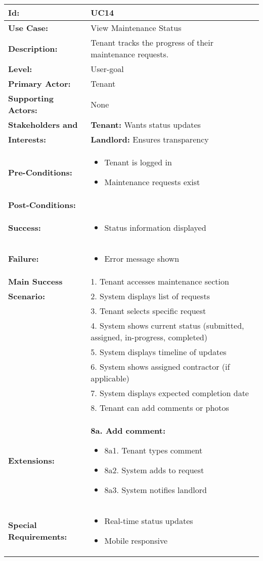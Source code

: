 \documentclass[12pt]{article}
\begin{document}
\begin{tabular}{|p{3cm}|p{11cm}|}
\hline
\textbf{Id:} & UC14 \\
\hline
\textbf{Use Case:} & View Maintenance Status \\
\hline
\textbf{Description:} & Tenant tracks the progress of their maintenance requests. \\
\hline
\textbf{Level:} & User-goal \\
\hline
\textbf{Primary Actor:} & Tenant \\
\hline
\textbf{Supporting Actors:} & None \\
\hline
\textbf{Stakeholders and} & \textbf{Tenant:} Wants status updates \\
\textbf{Interests:} & \textbf{Landlord:} Ensures transparency \\
\hline
\textbf{Pre-Conditions:} & 
\begin{itemize}
    \item Tenant is logged in
    \item Maintenance requests exist
\end{itemize} \\
\hline
\textbf{Post-Conditions:} & \\
\textbf{Success:} & 
\begin{itemize}
    \item Status information displayed
\end{itemize} \\
\textbf{Failure:} & 
\begin{itemize}
    \item Error message shown
\end{itemize} \\
\hline
\textbf{Main Success} & 1. Tenant accesses maintenance section \\
\textbf{Scenario:} & 2. System displays list of requests \\
& 3. Tenant selects specific request \\
& 4. System shows current status (submitted, assigned, in-progress, completed) \\
& 5. System displays timeline of updates \\
& 6. System shows assigned contractor (if applicable) \\
& 7. System displays expected completion date \\
& 8. Tenant can add comments or photos \\
\hline
\textbf{Extensions:} & 
\textbf{8a. Add comment:}
\begin{itemize}
    \item 8a1. Tenant types comment
    \item 8a2. System adds to request
    \item 8a3. System notifies landlord
\end{itemize} \\
\hline
\textbf{Special Requirements:} & 
\begin{itemize}
    \item Real-time status updates
    \item Mobile responsive
\end{itemize} \\
\hline
\end{tabular}
\end{document}
